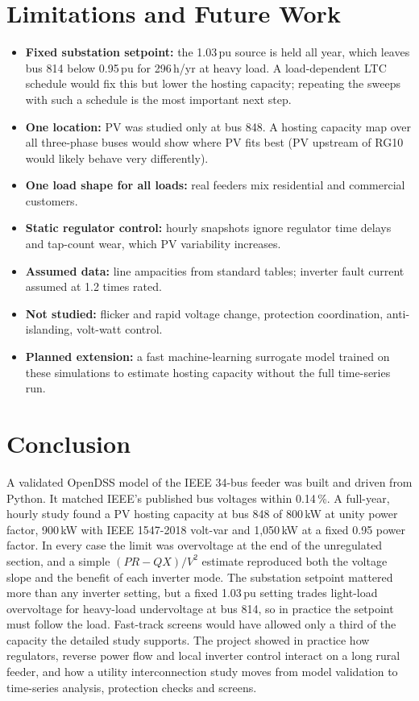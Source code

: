 \documentclass[11pt,letterpaper]{article}
\begin{document}
\section{Limitations and Future Work}
\begin{itemize}
  \item \textbf{Fixed substation setpoint:} the 1.03\,pu source is held all year, which leaves bus 814 below
        0.95\,pu for 296\,h/yr at heavy load. A load-dependent LTC schedule would fix this but lower the hosting
        capacity; repeating the sweeps with such a schedule is the most important next step.
  \item \textbf{One location:} PV was studied only at bus 848. A hosting capacity map over all three-phase buses
        would show where PV fits best (PV upstream of RG10 would likely behave very differently).
  \item \textbf{One load shape for all loads:} real feeders mix residential and commercial customers.
  \item \textbf{Static regulator control:} hourly snapshots ignore regulator time delays and tap-count wear,
        which PV variability increases.
  \item \textbf{Assumed data:} line ampacities from standard tables; inverter fault current assumed at
        1.2 times rated.
  \item \textbf{Not studied:} flicker and rapid voltage change, protection coordination, anti-islanding,
        volt-watt control.
  \item \textbf{Planned extension:} a fast machine-learning surrogate model trained on these simulations to
        estimate hosting capacity without the full time-series run.
\end{itemize}

\section{Conclusion}
A validated OpenDSS model of the IEEE 34-bus feeder was built and driven from Python. It matched IEEE's
published bus voltages within 0.14\,\%. A full-year, hourly study found a PV hosting capacity at bus 848 of
800\,kW at unity power factor, 900\,kW with IEEE 1547-2018 volt-var and 1{,}050\,kW at a fixed 0.95 power
factor. In every case the limit was overvoltage at the end of the unregulated section, and a simple
$(PR-QX)/V^2$ estimate reproduced both the voltage slope and the benefit of each inverter mode. The
substation setpoint mattered more than any inverter setting, but a fixed 1.03\,pu setting trades light-load
overvoltage for heavy-load undervoltage at bus 814, so in practice the setpoint must follow the load. Fast-track screens would have allowed only a
third of the capacity the detailed study supports. The project showed in practice how regulators, reverse
power flow and local inverter control interact on a long rural feeder, and how a utility interconnection
study moves from model validation to time-series analysis, protection checks and screens.
\end{document}
